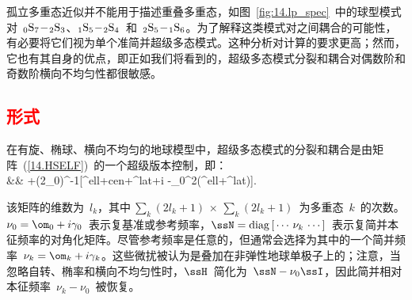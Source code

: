 孤立多重态近似并不能用于描述重叠多重态，如图~\ref{fig:14.lp_spec}~中的球型模式对~${}_0{\rm S}_7\!-\!{}_2{\rm S}_3$、${}_1{\rm S}_5\!-\!{}_2{\rm S}_4$~和~${}_2{\rm S}_5\!-\!{}_1{\rm S}_6$。为了解释这类模式对之间耦合的可能性，有必要将它们视为单个准简并超级多态模式。这种分析对计算的要求更高；然而，它也有其自身的优点，即正如我们将看到的，超级多态模式分裂和耦合对偶数阶和奇数阶横向不均匀性都很敏感。

\subsection{\textcolor{red}{形式}}

在有旋、椭球、横向不均匀的地球模型中，超级多态模式的分裂和耦合是由矩阵~(\ref{14.HSELF})~的一个超级版本控制，即：
\eqa \label{14.Htot} \lefteqn{
\ssH=\ssN-\nu_0\ssI+\ssW} \nonumber \\
&&\mbox{}
+(2\om_0)^{-1}[\ssV^{\rm ell+cen}+\ssV^{\rm lat}+i\ssA
-\om_0^2(\ssT^{\rm ell}+\ssT^{\rm lat})].
\ena

该矩阵的维数为~$l_k$，其中$~\sum_k(2l_k+1)\,
\times\,\sum_k(2l_k+1)$~为多重态~$k$~的次数。$\nu_0=\om_0+i\gamma_0$~表示复基准或参考频率，$\ssN={\rm diag}\,[\,\cdots\,\nu_k\,\cdots\,]$~表示复简并本征频率的对角化矩阵。尽管参考频率是任意的，但通常会选择为其中的一个简并频率~$\nu_k=\om_k+i\gamma_k$。这些微扰被认为是叠加在非弹性地球单极子上的；注意，当忽略自转、椭率和横向不均匀性时，$\ssH$~简化为~$\ssN-\nu_0\ssI$，因此简并相对本征频率~$\nu_k-\nu_0$~被恢复。

